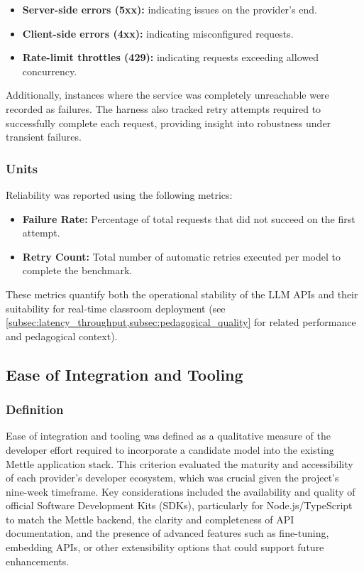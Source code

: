 \begin{itemize}
    \item \textbf{Server-side errors (5xx):} indicating issues on the provider's end.
    \item \textbf{Client-side errors (4xx):} indicating misconfigured requests.
    \item \textbf{Rate-limit throttles (429):} indicating requests exceeding allowed concurrency.
\end{itemize}

Additionally, instances where the service was completely unreachable were recorded as failures. The harness also tracked retry attempts required to successfully complete each request, providing insight into robustness under transient failures.

\subsubsection{Units}
\label{subsubsec:reliability_units}
Reliability was reported using the following metrics:

\begin{itemize}
    \item \textbf{Failure Rate:} Percentage of total requests that did not succeed on the first attempt.
    \item \textbf{Retry Count:} Total number of automatic retries executed per model to complete the benchmark.
\end{itemize}

These metrics quantify both the operational stability of the LLM APIs and their suitability for real-time classroom deployment (see \cref{subsec:latency_throughput,subsec:pedagogical_quality} for related performance and pedagogical context).

\subsection{Ease of Integration and Tooling}
\label{subsec:integration_tooling}

\subsubsection{Definition}
\label{subsubsec:integration_definition}
Ease of integration and tooling was defined as a qualitative measure of the developer effort required to incorporate a candidate model into the existing Mettle application stack. This criterion evaluated the maturity and accessibility of each provider's developer ecosystem, which was crucial given the project's nine-week timeframe. Key considerations included the availability and quality of official Software Development Kits (SDKs), particularly for Node.js/TypeScript to match the Mettle backend, the clarity and completeness of API documentation, and the presence of advanced features such as fine-tuning, embedding APIs, or other extensibility options that could support future enhancements.

